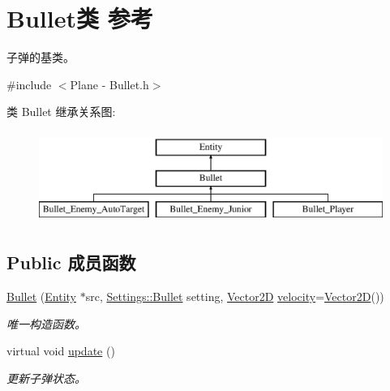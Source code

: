 \hypertarget{class_bullet}{}\section{Bullet类 参考}
\label{class_bullet}


子弹的基类。  




{\ttfamily \#include $<$Plane -\/ Bullet.\+h$>$}

类 Bullet 继承关系图\+:\begin{figure}[H]
\begin{center}
\leavevmode
\includegraphics[height=3.000000cm]{class_bullet}
\end{center}
\end{figure}
\subsection*{Public 成员函数}
\begin{DoxyCompactItemize}
\item 
\hyperlink{class_bullet_ae9b56731be2ca3ff77f3a3ee4eb0bd25}{Bullet} (\hyperlink{class_entity}{Entity} $\ast$src, \hyperlink{struct_settings_1_1_bullet}{Settings\+::\+Bullet} setting, \hyperlink{structbasic__vector2_d}{Vector2D} \hyperlink{class_entity_a386d25b56772b8913eb3e5adc636f6e0}{velocity}=\hyperlink{structbasic__vector2_d}{Vector2D}())
\begin{DoxyCompactList}\small\item\em 唯一构造函数。 \end{DoxyCompactList}\item 
\mbox{\label{class_bullet_a32f4a0611fe2dd245fee955d14ca1f68}} 
virtual void \hyperlink{class_bullet_a32f4a0611fe2dd245fee955d14ca1f68}{update} ()
\begin{DoxyCompactList}\small\item\em 更新子弹状态。 \end{DoxyCompactList}\end{DoxyCompactItemize}
